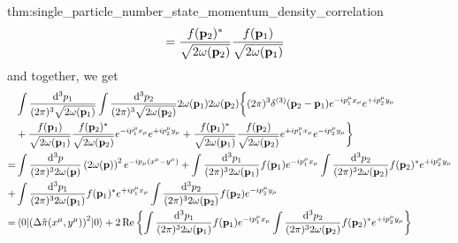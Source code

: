 \begin{delayedproof}{thm:single_particle_number_state_momentum_density_correlation}
\begin{equation*}
\begin{split}
			&=
			\frac{f(\vb{p}_2)^*}{\sqrt{2\omega(\vb{p}_2)}}
			\frac{f(\vb{p}_1)}{\sqrt{2\omega(\vb{p}_1)}}
		\end{split}
	\end{equation*}
	and together, we get
	\begin{equation*}
		\begin{split}
			&
			\int\frac{\dd[3]{p_1}}{(2\pi)^3\sqrt{2\omega(\vb{p}_1)}}
			\int\frac{\dd[3]{p_2}}{(2\pi)^3\sqrt{2\omega(\vb{p}_2)}}
			2\omega(\vb{p}_1)
			2\omega(\vb{p}_2)
			\biggl\{
				(2\pi)^3\delta^{(3)}(\vb{p}_2-\vb{p}_1)
				e^{-ip_1^\mu x_\mu}
				e^{+ip_2^\mu y_\mu}
				\\
				&+
				\frac{f(\vb{p}_1)}{\sqrt{2\omega(\vb{p}_1)}}
				\frac{f(\vb{p}_2)^*}{\sqrt{2\omega(\vb{p}_2)}}
				e^{-ip_1^\mu x_\mu}
				e^{+ip_2^\mu y_\mu}
				+
				\frac{f(\vb{p}_1)^*}{\sqrt{2\omega(\vb{p}_1)}}
				\frac{f(\vb{p}_2)}{\sqrt{2\omega(\vb{p}_2)}}
				e^{+ip_1^\mu x_\mu}
				e^{-ip_2^\mu y_\mu}
			\biggr\}
			\\
			=&
			\int\frac{\dd[3]{p}}{(2\pi)^32\omega(\vb{p})}
			\left(2\omega(\vb{p})\right)^2
			e^{-ip_\mu(x^\mu-y^\mu)}
			+
			\int\frac{\dd[3]{p_1}}{(2\pi)^32\omega(\vb{p}_1)}
			f(\vb{p}_1)
			e^{-ip_1^\mu x_\mu}
			\int\frac{\dd[3]{p_2}}{(2\pi)^32\omega(\vb{p}_2)}
			f(\vb{p}_2)^*
			e^{+ip_2^\mu y_\mu}
			\\
			+&
			\int\frac{\dd[3]{p_1}}{(2\pi)^32\omega(\vb{p}_1)}
			f(\vb{p}_1)^*
			e^{+ip_1^\mu x_\mu}
			\int\frac{\dd[3]{p_2}}{(2\pi)^32\omega(\vb{p}_2)}
			f(\vb{p}_2)
			e^{-ip_2^\mu y_\mu}
			\\
			=&
			\expval{\left(\Delta\hat\pi(x^\mu,y^\mu)\right)^2}{0}
			+
			2\operatorname{\operatorname{Re}}\left\{
				\int\frac{\dd[3]{p_1}}{(2\pi)^32\omega(\vb{p}_1)}
				f(\vb{p}_1)
				e^{-ip_1^\mu x_\mu}
				\int\frac{\dd[3]{p_2}}{(2\pi)^32\omega(\vb{p}_2)}
				f(\vb{p}_2)^*
				e^{+ip_2^\mu y_\mu}
			\right\}
		\end{split}
	\end{equation*}
\end{delayedproof}

